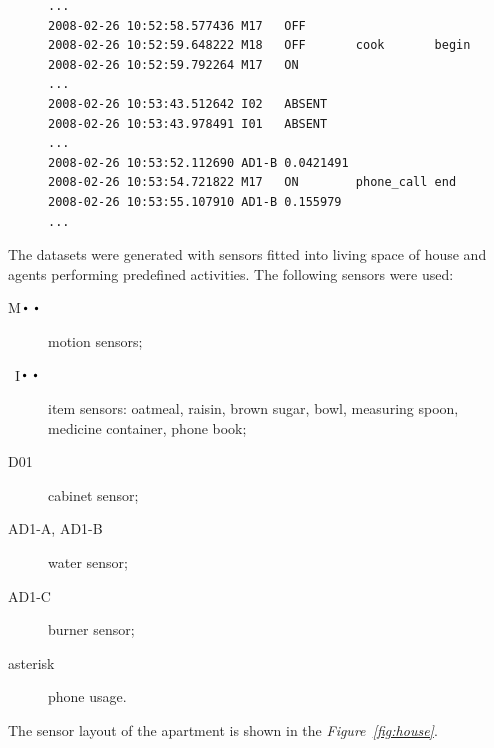 \documentclass[12pt, a4paper, pdflatex, leqno, twoside, openright]{report}
\DeclareMathOperator*{\Bigcdot}{\scalerel*{\cdot}{\bigodot}}
\begin{document}
\begin{figure}[htb]
  \begin{lstlisting}
...
2008-02-26 10:52:58.577436 M17   OFF
2008-02-26 10:52:59.648222 M18   OFF       cook       begin
2008-02-26 10:52:59.792264 M17   ON
...
2008-02-26 10:53:43.512642 I02   ABSENT
2008-02-26 10:53:43.978491 I01   ABSENT
...
2008-02-26 10:53:52.112690 AD1-B 0.0421491
2008-02-26 10:53:54.721822 M17   ON        phone_call end
2008-02-26 10:53:55.107910 AD1-B 0.155979
...
  \end{lstlisting}
\end{figure}

The datasets were generated with sensors fitted into living space of house and agents performing predefined activities. The following sensors were used:
\begin{description}
\item[M$\Bigcdot\Bigcdot$] motion sensors;
\item[~I$\Bigcdot\Bigcdot$] item sensors: oatmeal, raisin, brown sugar, bowl, measuring spoon, medicine container, phone book;
\item[D01] cabinet sensor;
\item[AD1-A, AD1-B] water sensor;
\item[AD1-C] burner sensor;
\item[asterisk] phone usage.
\end{description}

The sensor layout of the apartment is shown in the \emph{Figure~\ref{fig:house}}.
\end{document}
